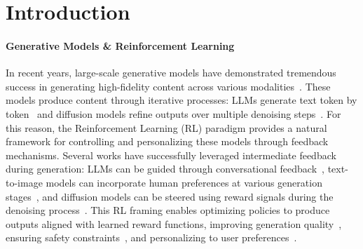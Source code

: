 \documentclass{article}
\begin{document}
\section{Introduction}
\vspace{-0.1cm}\paragraph{Generative Models \& Reinforcement Learning}
In recent years, large-scale generative models have demonstrated tremendous success in generating high-fidelity content across various modalities~\citep{DBLP:journals/corr/abs-2005-14165, DBLP:journals/corr/abs-2112-10752, brooks2024video}. These models produce content through iterative processes: LLMs generate text token by token~\citep{DBLP:journals/corr/abs-2005-14165, ouyang2022traininglanguagemodelsfollow} and diffusion models refine outputs over multiple denoising steps~\citep{DBLP:journals/corr/abs-2105-05233}. For this reason, the Reinforcement Learning (RL) paradigm provides a natural framework for controlling and personalizing these models through feedback mechanisms. Several works have successfully leveraged intermediate feedback during generation: LLMs can be guided through conversational feedback~\citep{ouyang2022traininglanguagemodelsfollow, christiano2023deepreinforcementlearninghuman}, text-to-image models can incorporate human preferences at various generation stages~\citep{lee2023aligningtexttoimagemodelsusing, black2024trainingdiffusionmodelsreinforcement}, and diffusion models can be steered using reward signals during the denoising process~\citep{fan2023dpokreinforcementlearningfinetuning, clark2024directlyfinetuningdiffusionmodels}. This RL framing enables optimizing policies to produce outputs aligned with learned reward functions, improving generation quality~\citep{lee2023aligningtexttoimagemodelsusing, xu2023imagerewardlearningevaluatinghuman}, ensuring safety constraints~\citep{bai2022constitutional, bai2022training}, and personalizing to user preferences~\citep{ouyang2022traininglanguagemodelsfollow, rafailov2024directpreferenceoptimizationlanguage, stiennon2022learningsummarizehumanfeedback}.
\end{document}
